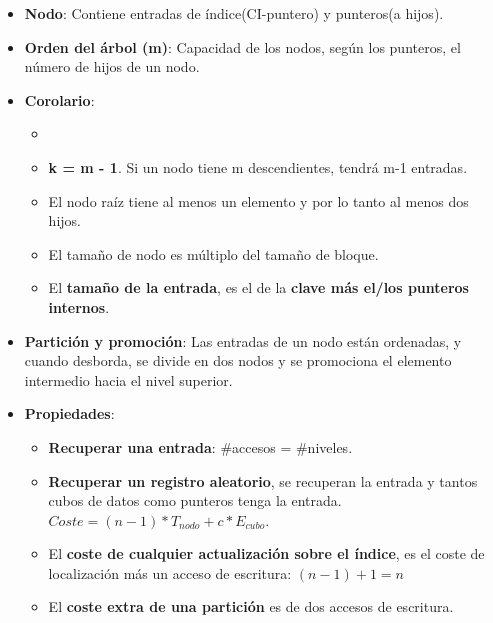 \documentclass[12pt, twoside, openright]{report} %
\begin{document}
  \begin{itemize}
  \item \textbf{Nodo}: Contiene entradas de índice(CI-puntero) y punteros(a
    hijos).
    
  \item \textbf{Orden del árbol (m)}: Capacidad de los nodos, según los
    punteros, el número de hijos de un nodo.
    
  \item \textbf{Corolario}:
    

    \begin{itemize}
    \item \item \textbf{k = m - 1}. Si un nodo tiene m descendientes, tendrá m-1
      entradas.
      
    \item El nodo raíz tiene al menos un elemento y por lo tanto al menos
      dos hijos.
      
    \item El tamaño de nodo es múltiplo del tamaño de bloque.
      
    \item El \textbf{tamaño de la entrada}, es el de la \textbf{clave más
      el/los punteros internos}.
      
    \end{itemize}
  \item \textbf{Partición y promoción}: Las entradas de un nodo están
    ordenadas, y cuando desborda, se divide en dos nodos y se promociona
    el elemento intermedio hacia el nivel superior.
    \pagebreak
  \item \textbf{Propiedades}:
    

    \begin{itemize}
    \item \textbf{Recuperar una entrada}: \#accesos = \#niveles.
      
    \item \textbf{Recuperar un registro aleatorio}, se recuperan la entrada
      y tantos cubos de datos como punteros tenga la entrada. $Coste= (n-1)*T_{nodo} + c*E_{cubo}$.
      
    \item El \textbf{coste de cualquier actualización sobre el índice}, es
      el coste de localización más un acceso de escritura: $(n-1) +1 = n$
      
    \item El \textbf{coste extra de una partición} es de dos accesos de
      escritura.
      

\end{itemize}
\end{itemize}
\end{document}
